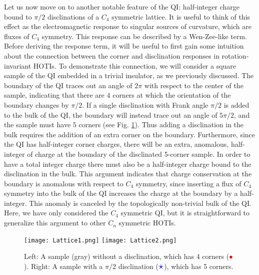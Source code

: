 \documentclass[%
 reprint,
 amsmath,amssymb,
 aps,
]{revtex4-1}
\begin{document}
Let us now move on to another notable feature of the QI: half-integer charge bound to $\pi/2$ disclinations of a $C_4$ symmetric lattice. It is useful to think of this effect as the electromagnetic response to singular sources of curvature, which are fluxes of $C_4$ symmetry. This response can be described by a Wen-Zee-like term\cite{wen1992shift,han2019generalized}. Before deriving the response term, it will be useful to first gain some intuition about the connection between the corner and disclination responses in rotation-invariant HOTIs\cite{li2020fractional}. To demonstrate this connection, we will consider a square sample of the QI embedded in a trivial insulator, as we previously discussed. The boundary of the QI traces out an angle of $2\pi$ with respect to the center of the sample, indicating that there are $4$ corners at which the orientation of the boundary changes by $\pi/2$. If a single disclination with Frank angle $\pi/2$ is added to the bulk of the QI, the boundary will instead trace out an angle of $5\pi/2$, and the sample must have $5$ corners (see Fig. \ref{fig:LatticeDisc}). Thus adding a disclination in the bulk requires the addition of an extra corner on the boundary. Furthermore, since the QI has half-integer corner charges, there will be an extra, anomalous, half-integer of charge at the boundary of the disclinated 5-corner sample. In order to have a total integer charge there must also be a half-integer charge bound to the disclination in the bulk. 
This argument indicates that charge conservation at the boundary is anomalous with respect to $C_4$ symmetry, since inserting a flux of $C_4$ symmetry into the bulk of the QI increases the charge at the boundary by a half-integer. This anomaly is canceled by the topologically non-trivial bulk of the QI. Here, we have only considered the $C_4$ symmetric QI, but it is straightforward to generalize this argument to other $C_n$ symmetric HOTIs. 


\begin{figure}
\centering
\texttt{[image: Lattice1.png]}
\texttt{[image: Lattice2.png]}
\caption{Left: A sample (gray) without a disclination, which has 4 corners ($\color{red}\mathlarger{\bullet}$). Right: A sample with a $\pi/2$ disclination ($\color{blue}\mathlarger{\mathlarger{\mathlarger{\star}}}$), which has 5 corners.}\label{fig:LatticeDisc}
\end{figure}
\end{document}

